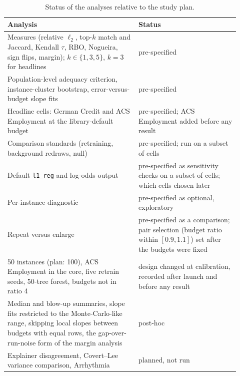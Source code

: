 \begin{table}[h]
\centering\small
\begin{tabular}{p{0.52\linewidth}p{0.4\linewidth}}
\toprule
Analysis & Status \\
\midrule
Measures (relative $\ell_2$, top-$k$ match and Jaccard, Kendall $\tau$, RBO, Nogueira, sign flips, margin); $k\in\{1,3,5\}$, $k=3$ for headlines & pre-specified \\
Population-level adequacy criterion, instance-cluster bootstrap, error-versus-budget slope fits & pre-specified \\
Headline cells: German Credit and ACS Employment at the library-default budget & pre-specified; ACS Employment added before any result \\
Comparison standards (retraining, background redraws, null) & pre-specified; run on a subset of cells \\
Default \texttt{l1\_reg} and log-odds output & pre-specified as sensitivity checks on a subset of cells; which cells chosen later \\
Per-instance diagnostic & pre-specified as optional, exploratory \\
Repeat versus enlarge & pre-specified as a comparison; pair selection (budget ratio within $[0.9,1.1]$) set after the budgets were fixed \\
50 instances (plan: 100), ACS Employment in the core, five retrain seeds, 50-tree forest, budgets not in ratio 4 & design changed at calibration, recorded after launch and before any result \\
Median and blow-up summaries, slope fits restricted to the Monte-Carlo-like range, skipping local slopes between budgets with equal rows, the gap-over-run-noise form of the margin analysis & post-hoc \\
Explainer disagreement, Covert--Lee variance comparison, Arrhythmia & planned, not run \\
\bottomrule
\end{tabular}
\caption{Status of the analyses relative to the study plan.}
\label{tab:prereg}
\end{table}
